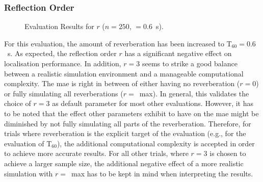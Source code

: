 \subsubsection*{Reflection Order}
\begin{figure}[H]
\iftoggle{quick}{
    \texttt{[image: plots/boxplots/boxplot-joined-reflect-order]}
}{%
    
}
	\caption[Evaluation Results for $r$]{Evaluation Results for $r$ ($n=250$, \Tsixty$=0.6$~s).}
	\label{fig:trialR}
\end{figure}

For this evaluation, the amount of reverberation has been increased to T$_{60}=0.6$~s. As expected, the reflection order $r$ has a significant negative effect on localisation performance. In addition, $r=3$ seems to strike a good balance between a realistic simulation environment and a manageable computational complexity. The \gls{mae} is right in between of either having no reverberation ($r=0$) or fully simulating all reverberations ($r=$~max). In general, this validates the choice of $r=3$ as default parameter for most other evaluations. However, it has to be noted that the effect other parameters exhibit to have on the \gls{mae} might be diminished by not fully simulating all parts of the reverberation. Therefore, for trials where reverberation is the explicit target of the evaluation (e.g., for the evaluation of T$_{60}$), the additional computational complexity is accepted in order to achieve more accurate results. For all other trials, where $r=3$ is chosen to achieve a larger sample size, the additional negative effect of a more realistic simulation with $r=$~max has to be kept in mind when interpreting the results.